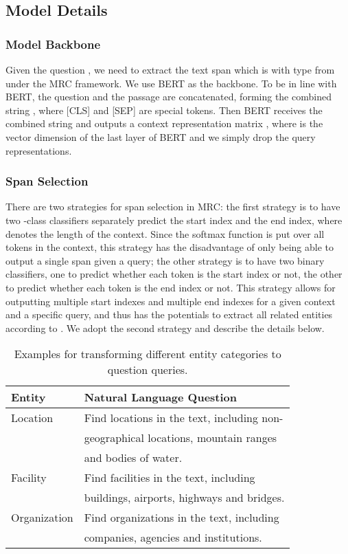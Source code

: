 \documentclass[11pt,a4paper]{article}
\begin{document}
\subsection{Model Details} 
\subsubsection{Model Backbone}
Given the question ,
we need to extract the text span  which is with type   from  under the MRC framework.  
We use BERT \cite{devlin2018bert} as the backbone. 
To be in line with BERT, the question   and the passage  are concatenated, forming the combined string 
 , where [CLS] and [SEP] are special tokens. Then BERT receives the combined string and outputs a context representation matrix , where  is the vector dimension of the last layer of BERT and we simply drop the query representations. 
 
\subsubsection{Span Selection} There are  two strategies  for span selection in MRC:
the first strategy \cite{seo2016bidirectional,wang2016multi} is to have two -class classifiers separately predict the  start index and the end index, where  denotes the length of the context.
Since the softmax function is put over all tokens in the context, this strategy has the disadvantage of only being able to output a single span given a query; 
the other strategy is to have two binary classifiers, 
one to predict whether each  token is the start index or not, 
the other to predict whether each token is the end index or not. 
This strategy allows for outputting multiple start indexes and multiple end indexes for a given context and a specific query, and thus has the potentials to extract all related entities according to .
We adopt the second strategy and describe the details below.

\begin{table}[t]
\center
\small
\begin{tabular}{ll}\hline
{\bf Entity} & {\bf Natural Language Question} \\\hline
Location  & Find locations in the text,  including  non-\\
&geographical locations, mountain ranges
\\
&and bodies of water.  \\
Facility & Find facilities in the text, including \\
&buildings,  airports, highways and bridges.  \\ 
Organization  & Find organizations  in the text, including \\
& companies, agencies and institutions.  \\\hline
\end{tabular}
\caption{Examples for transforming different entity categories to question queries. }
\label{entitytemplate}
\end{table}
\end{document}
